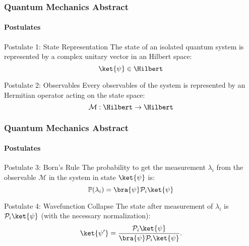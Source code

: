 \begin{frame}
    \frametitle{Quantum Mechanics Abstract}
    \framesubtitle{Postulates}

    \begin{block}{Postulate 1: State Representation}
        The state of an isolated quantum system is represented by a complex unitary 
        vector in an Hilbert space:
        \begin{equation*}
            \ket{\psi} \in \Hilbert
        \end{equation*}
    \end{block}
    \begin{block}{Postulate 2: Observables}
        Every observables of the system is represented by an Hermitian operator
        acting on the state space:
        \begin{equation*}
            \mathcal{M}:\Hilbert\to\Hilbert
        \end{equation*}
    \end{block}
\end{frame}

\begin{frame}
    \frametitle{Quantum Mechanics Abstract}
    \framesubtitle{Postulates}

    \begin{block}{Postulate 3: Born's Rule}
        The probability to get the measurement $\lambda_i$ from the observable 
        $\mathcal{M}$ in the system in state $\ket{\psi}$ is:
        \begin{equation*}
            \mathbb{P}(\lambda_i)=\bra{\psi}\mathcal{P}_i\ket{\psi}
        \end{equation*}
    \end{block}
    \begin{block}{Postulate 4: Wavefunction Collapse}
        The state after measurement of $\lambda_i$ is $\mathcal{P}_i\ket{\psi}$ (with the
        necessary normalization):
        \begin{equation*}
            \ket{\psi'}=\frac{\mathcal{P}_i\ket{\psi}}{\bra{\psi}\mathcal{P}_i\ket{\psi}}.
        \end{equation*}
    \end{block}
\end{frame}

